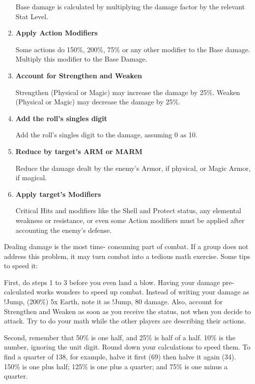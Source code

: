 \begin{multicols}{2}
\begin{enumerate}
Base damage is calculated by multiplying the
damage factor by the relevant Stat Level.

\item \textbf{Apply Action Modifiers}

Some actions do 150\%, 200\%, 75\% or any
other modifier to the Base damage. Multiply this
modifier to the Base Damage.

\item \textbf{Account for Strengthen and Weaken}

Strengthen (Physical or Magic) may increase
the damage by 25\%. Weaken (Physical or Magic)
may decrease the damage by 25\%.

\item \textbf{Add the roll's singles digit}

Add the roll's singles digit to the damage,
assuming 0 as 10.

\item \textbf{Reduce by target's ARM or MARM}

Reduce the damage dealt by the enemy's
Armor, if physical, or Magic Armor, if magical.

\item \textbf{Apply target's Modifiers}

Critical Hits and modifiers like the Shell and
Protect status, any elemental weakness or
resistance, or even some Action modifiers must be
applied after accounting the enemy's defense.
\end{enumerate}

Dealing damage is the most time-
consuming part of combat. If a group does not
address this problem, it may turn combat into a
tedious math exercise. Some tips to speed it:

First, do steps 1 to 3 before you even land
a blow. Having your damage pre-calculated
works wonders to speed up combat. Instead of
writing your damage as !Jump, (200\%) 5x Earth,
note it as !Jump, 80 damage. Also, account for
Strengthen and Weaken as soon as you receive
the status, not when you decide to attack. Try to
do your math while the other players are
describing their actions.

Second, remember that 50\% is one half,
and 25\% is half of a half. 10\% is the number,
ignoring the unit digit. Round down your
calculations to speed them. To find a quarter of
138, for example, halve it first (69) then halve it
again (34). 150\% is one plus half; 125\% is one
plus a quarter; and 75\% is one minus a quarter.


\end{multicols}
